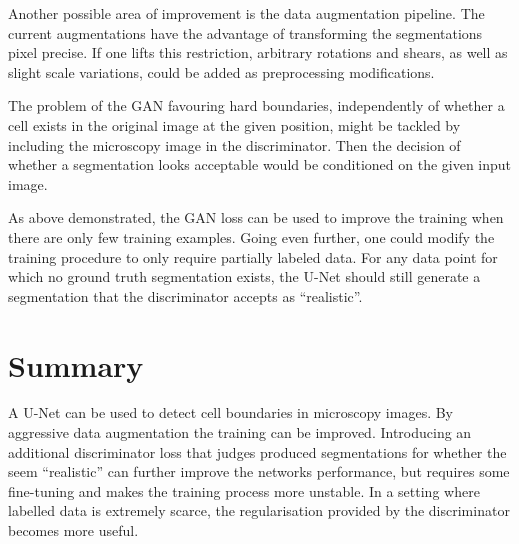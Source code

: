 \documentclass[aps,prl,twocolumn,groupedaddress,amsmath,amssymb]{revtex4-1}
\begin{document}
    Another possible area of improvement is the data augmentation pipeline. The current
    augmentations have the advantage of transforming the segmentations pixel precise. If one lifts
    this restriction, arbitrary rotations and shears, as well as slight scale variations, could be
    added as preprocessing modifications.

    The problem of the GAN favouring hard boundaries, independently of whether a cell exists in the
    original image at the given position, might be tackled by including the microscopy image in the
    discriminator. Then the decision of whether a segmentation looks acceptable would be conditioned
    on the given input image.

    As above demonstrated, the GAN loss can be used to improve the training when there are only few
    training examples. Going even further, one could modify the training procedure to only require
    partially labeled data. For any data point for which no ground truth segmentation exists, the
    U-Net should still generate a segmentation that the discriminator accepts as ``realistic''.


    \section{Summary}

    A U-Net can be used to detect cell boundaries in microscopy images. By aggressive data
    augmentation the training can be improved. Introducing an additional discriminator loss that
    judges produced segmentations for whether the seem ``realistic'' can further improve the
    networks performance, but requires some fine-tuning and makes the training process more
    unstable. In a setting where labelled data is extremely scarce, the regularisation provided by
    the discriminator becomes more useful.




    
     
\end{document}
